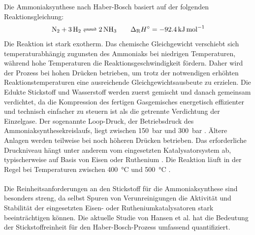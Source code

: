 Die Ammoniaksynthese nach Haber-Bosch basiert auf der folgenden Reaktionsgleichung:
\[
\ce{N2 + 3 H2 <=> 2 NH3} \qquad \Delta_\mathrm{R} H^\circ = \SI{-92.4}{\kilo\joule\per\mol}
\]
Die Reaktion ist stark exotherm. Das chemische Gleichgewicht verschiebt sich temperaturabhängig zugunsten des Ammoniaks bei niedrigen Temperaturen, während hohe Temperaturen die Reaktionsgeschwindigkeit fördern. Daher wird der Prozess bei hohen Drücken betrieben, um trotz der notwendigen erhöhten Reaktionstemperaturen eine ausreichende Gleichgewichtsausbeute zu erzielen. Die Edukte Stickstoff und Wasserstoff werden zuerst gemischt und  danach gemeinsam verdichtet, da die Kompression des fertigen Gasgemisches energetisch effizienter und technisch einfacher zu steuern ist als die getrennte Verdichtung der Einzelgase. Der sogenannte Loop-Druck, der Betriebsdruck des Ammoniaksynthesekreislaufs, liegt zwischen \SI{150}{\bar} und \SI{300}{\bar} \cite{applAmmonia1Introduction2011, applAmmonia2Production2011, humphreysDevelopmentRecentProgress2021}. Ältere Anlagen werden teilweise bei noch höheren Drücken betrieben. Das erforderliche Druckniveau hängt unter anderem vom eingesetzten Katalysatorsystem ab, typischerweise auf Basis von Eisen oder Ruthenium \cite{hansenImportanceGasPurity2025, applAmmonia1Introduction2011}. Die Reaktion läuft in der Regel bei Temperaturen zwischen \SI{400}{\celsius} und \SI{500}{\celsius} \cite{applAmmonia1Introduction2011}. \\
\\
Die Reinheitsanforderungen an den Stickstoff für die Ammoniaksynthese sind besonders streng, da selbst Spuren von Verunreinigungen die Aktivität und Stabilität der eingesetzten Eisen- oder Rutheniumkatalysatoren stark beeinträchtigen können. Die aktuelle Studie von Hansen et al. \cite{hansenImportanceGasPurity2025} hat die Bedeutung der Stickstoffreinheit für den Haber-Bosch-Prozess umfassend quantifiziert.\\
